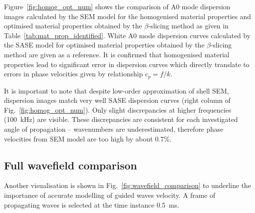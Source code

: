 \documentclass[preprint,12pt]{elsarticle}
\begin{document}
Figure~\ref{fig:homog_opt_num} shows the comparison of A0 mode dispersion images calculated by the SEM model for the homogenised material properties and optimised material properties obtained by the $\beta$-slicing method as given in Table~\ref{tab:mat_prop_identified}. 
White A0 mode dispersion curves calculated by the SASE model for optimised material properties obtained by the $\beta$-slicing method are given as a reference. 
It is confirmed that homogenised material properties lead to significant error in dispersion curves which directly translate to errors in phase velocities given by relationship $c_p= f/k$.

It is important to note that despite low-order approximation of shell SEM, dispersion images match very well SASE dispersion curves (right column of Fig.~\ref{fig:homog_opt_num}). 
Only slight discrepancies at higher frequencies (100~kHz) are visible. 
These discrepancies are consistent for each investigated angle of propagation – wavenumbers are underestimated, therefore phase velocities from SEM model are too high by about 0.7\%.
\subsection{Full wavefield comparison}
Another visualisation is shown in Fig.~\ref{fig:wavefield_comparison} to underline the importance of accurate modelling of guided waves velocity. 
A frame of propagating waves is selected at the time instance 0.5~ms. 
\end{document}
